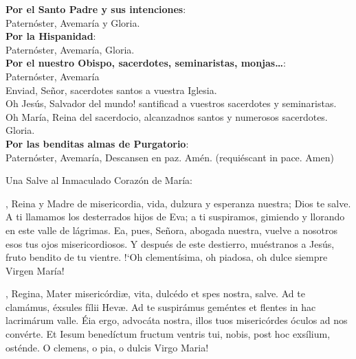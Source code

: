 \documentclass[10pt,a4paper,oneside]{book}
\begin{document}
\textbf{Por el Santo Padre y sus intenciones}:\\
\hspace*{10mm}Paternóster, Avemaría y Gloria.\\
\textbf{Por la Hispanidad}:\\ 
\hspace*{10mm}Paternóster, Avemaría, Gloria.\\
\textbf{Por el nuestro Obispo, sacerdotes, seminaristas, monjas\ldots}:\\ 
\hspace*{10mm}Paternóster, Avemaría\\
\hspace*{10mm}Enviad, Señor, sacerdotes santos a vuestra Iglesia.\\
\hspace*{10mm}{!`}Oh Jesús, Salvador del mundo! santificad a vuestros sacerdotes y seminaristas.\\
\hspace*{10mm}Oh María, Reina del sacerdocio, alcanzadnos santos y numerosos sacerdotes.\\
\hspace*{10mm}Gloria.\\
\textbf{Por las benditas almas de Purgatorio}:\\
\hspace*{10mm}Paternóster, Avemaría, Descansen en paz. Amén. (requiéscant in pace. Amen)

\bigskip
{\label{hailMaryQueen}}Una Salve al Inmaculado Corazón de María:\\
\smallskip
\begin{minipage}[t]{0.475\textwidth}
    , Reina y Madre de misericordia, vida, dulzura y esperanza nuestra; Dios te salve.
    A ti llamamos los desterrados hijos de Eva; a ti suspiramos, gimiendo y llorando en este valle de lágrimas.
    Ea, pues, Señora, abogada nuestra, vuelve a nosotros esos tus ojos misericordiosos. Y después de este destierro, muéstranos a Jesús,
    fruto bendito de tu vientre. {!`}Oh clementísima, oh piadosa, oh dulce siempre Virgen María!\\
    \ruegapornosotrossalve
\end{minipage}
\begin{minipage}[t]{0.475\textwidth}
    , Regina, Mater misericórdi{\ae}, vita, dulcédo et spes nostra, salve. Ad te clamámus, éxsules fílii Hev{\ae}.
    Ad te suspirámus geméntes et flentes in hac lacrimárum valle. Éia ergo, advocáta nostra, illos tuos misericórdes óculos ad nos convérte.
    Et Iesum benedíctum fructum ventris tui, nobis, post hoc exsílium, osténde. O clemens, o pia, o dulcis Virgo Maria!\\
    \orapronobissalve
\end{minipage}
\end{document}
